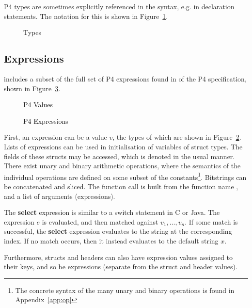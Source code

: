 \documentclass[UTF8]{article}
\begin{document}
P4 types are sometimes explicitly referenced in the syntax, e.g. in declaration statements. The notation for this is shown in Figure~\ref{fig:types}.

\begin{figure}[h!]
\centering\ottgrammartabular{
\otttau\ottafterlastrule
}
\caption{Types}
\label{fig:types}
\end{figure}

\subsection{Expressions}
\newcommand{\fmap}{\textit{F}}

\pfott{} includes a subset of the full set of P4 expressions found in {} of the P4 specification, shown in Figure~\ref{fig:exp}.

\begin{figure}[h!]
\centering\ottgrammartabular{
\ottv\ottafterlastrule
}
\caption{P4 Values}
\label{fig:val}
\end{figure}

\begin{figure}[h!]
\centering\ottgrammartabular{
\otte\ottafterlastrule
}
\caption{P4 Expressions}
\label{fig:exp}
\end{figure}
\newcommand{\stmt}{\textit{stmt}}
\newcommand{\cval}{\ensuremath{v}}
\newcommand{\fexec}[1]{\textbf{exec}\,\,#1}

First, an expression can be a value $v$, the types of which are shown in Figure~\ref{fig:val}. Lists of expressions can be used in initialisation of variables of struct types. The fields of these structs may be accessed, which is denoted in the usual manner. There exist unary and binary arithmetic operations, where the semantics of the individual operations are defined on some subset of the constants\footnote{The concrete syntax of the many unary and binary operations is found in Appendix~\ref{app:op}}. Bitstrings can be concatenated and sliced. The function call is built from the function name \fn{}, and a list of arguments (expressions).

The \textbf{select} expression is similar to a switch statement in C or Java. The expression $e$ is evaluated, and then matched against $v_1 , \ldots , v_n$. If some match is successful, the \textbf{select} expression evaluates to the string at the corresponding index. If no match occurs, then it instead evaluates to the default string $x$.

Furthermore, structs and headers can also have expression values assigned to their keys, and so be expressions (separate from the struct and header values).
\end{document}
